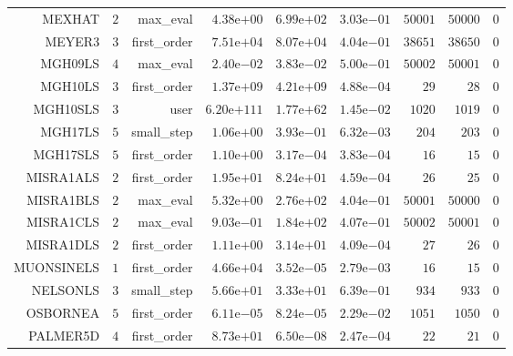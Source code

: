 \begin{longtable}{rrrrrrrrr}
MEXHAT & \(     2\) & max\_eval & \( 4.38\)e\(+00\) & \( 6.99\)e\(+02\) & \( 3.03\)e\(-01\) & \( 50001\) & \( 50000\) & \(     0\) \\
MEYER3 & \(     3\) & first\_order & \( 7.51\)e\(+04\) & \( 8.07\)e\(+04\) & \( 4.04\)e\(-01\) & \( 38651\) & \( 38650\) & \(     0\) \\
MGH09LS & \(     4\) & max\_eval & \( 2.40\)e\(-02\) & \( 3.83\)e\(-02\) & \( 5.00\)e\(-01\) & \( 50002\) & \( 50001\) & \(     0\) \\
MGH10LS & \(     3\) & first\_order & \( 1.37\)e\(+09\) & \( 4.21\)e\(+09\) & \( 4.88\)e\(-04\) & \(    29\) & \(    28\) & \(     0\) \\
MGH10SLS & \(     3\) & user & \(6.20\)e\(+111\) & \( 1.77\)e\(+62\) & \( 1.45\)e\(-02\) & \(  1020\) & \(  1019\) & \(     0\) \\
MGH17LS & \(     5\) & small\_step & \( 1.06\)e\(+00\) & \( 3.93\)e\(-01\) & \( 6.32\)e\(-03\) & \(   204\) & \(   203\) & \(     0\) \\
MGH17SLS & \(     5\) & first\_order & \( 1.10\)e\(+00\) & \( 3.17\)e\(-04\) & \( 3.83\)e\(-04\) & \(    16\) & \(    15\) & \(     0\) \\
MISRA1ALS & \(     2\) & first\_order & \( 1.95\)e\(+01\) & \( 8.24\)e\(+01\) & \( 4.59\)e\(-04\) & \(    26\) & \(    25\) & \(     0\) \\
MISRA1BLS & \(     2\) & max\_eval & \( 5.32\)e\(+00\) & \( 2.76\)e\(+02\) & \( 4.04\)e\(-01\) & \( 50001\) & \( 50000\) & \(     0\) \\
MISRA1CLS & \(     2\) & max\_eval & \( 9.03\)e\(-01\) & \( 1.84\)e\(+02\) & \( 4.07\)e\(-01\) & \( 50002\) & \( 50001\) & \(     0\) \\
MISRA1DLS & \(     2\) & first\_order & \( 1.11\)e\(+00\) & \( 3.14\)e\(+01\) & \( 4.09\)e\(-04\) & \(    27\) & \(    26\) & \(     0\) \\
MUONSINELS & \(     1\) & first\_order & \( 4.66\)e\(+04\) & \( 3.52\)e\(-05\) & \( 2.79\)e\(-03\) & \(    16\) & \(    15\) & \(     0\) \\
NELSONLS & \(     3\) & small\_step & \( 5.66\)e\(+01\) & \( 3.33\)e\(+01\) & \( 6.39\)e\(-01\) & \(   934\) & \(   933\) & \(     0\) \\
OSBORNEA & \(     5\) & first\_order & \( 6.11\)e\(-05\) & \( 8.24\)e\(-05\) & \( 2.29\)e\(-02\) & \(  1051\) & \(  1050\) & \(     0\) \\
PALMER5D & \(     4\) & first\_order & \( 8.73\)e\(+01\) & \( 6.50\)e\(-08\) & \( 2.47\)e\(-04\) & \(    22\) & \(    21\) & \(     0\) \\

\end{longtable}
